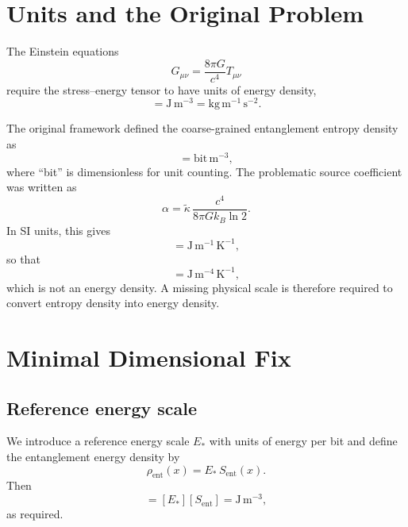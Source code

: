 \documentclass[11pt]{article}
\begin{document}
\section{Units and the Original Problem}

The Einstein equations
\begin{equation}
G_{\mu\nu} = \frac{8\pi G}{c^4} T_{\mu\nu}
\end{equation}
require the stress--energy tensor to have units of energy density,
\begin{equation}
[T_{\mu\nu}] = \mathrm{J\,m^{-3}} = \mathrm{kg\,m^{-1}\,s^{-2}}.
\end{equation}

The original framework defined the coarse-grained entanglement entropy density as
\begin{equation}
[S_{\mathrm{ent}}] = \mathrm{bit\,m^{-3}},
\end{equation}
where ``bit'' is dimensionless for unit counting. The problematic source coefficient was written as
\begin{equation}
\alpha = \tilde{\kappa}\,\frac{c^4}{8\pi G k_B \ln 2}.
\end{equation}
In SI units, this gives
\begin{equation}
[\alpha] = \mathrm{J\,m^{-1}\,K^{-1}},
\end{equation}
so that
\begin{equation}
[\alpha S_{\mathrm{ent}}] = \mathrm{J\,m^{-4}\,K^{-1}},
\end{equation}
which is not an energy density. A missing physical scale is therefore required to convert entropy density into energy density.

\section{Minimal Dimensional Fix}

\subsection{Reference energy scale}

We introduce a reference energy scale $E_*$ with units of energy per bit and define the entanglement energy density by
\begin{equation}
\rho_{\mathrm{ent}}(x) = E_*\,S_{\mathrm{ent}}(x).
\end{equation}
Then
\begin{equation}
[\rho_{\mathrm{ent}}] = [E_*][S_{\mathrm{ent}}] = \mathrm{J\,m^{-3}},
\end{equation}
as required.
\end{document}
